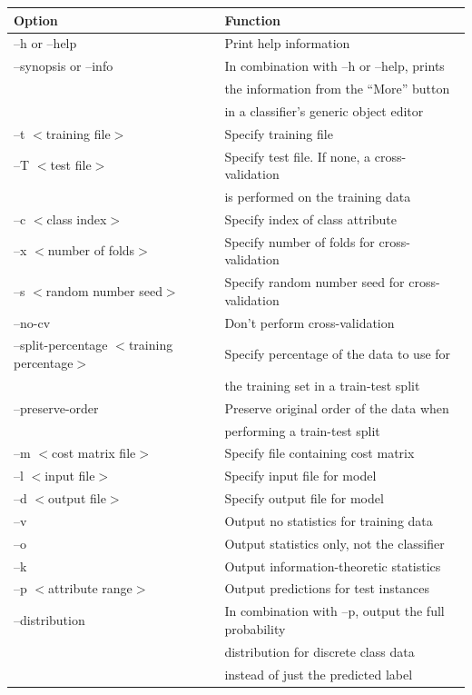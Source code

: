 \begin{table}[!thp]
\footnotesize
{\centering \begin{tabular}{ll}
\hline
Option & Function \\
\hline
--h or --help & Print help information \\
--synopsis or --info & In combination with --h or --help, prints \\
& the information from the ``More'' button \\
& in a classifier's generic object editor \\
--t $<$training file$>$ & Specify training file \\
--T $<$test file$>$ & Specify test file. If none, a cross-validation \\
& is performed on the training data \\
--c $<$class index$>$ & Specify index of class attribute \\
--x $<$number of folds$>$ & Specify number of folds for cross-validation \\
--s $<$random number seed$>$ & Specify random number seed for cross-validation \\
--no-cv & Don't perform cross-validation \\
--split-percentage $<$training percentage$>$ & Specify percentage of the data to use for \\
& the training set in a train-test split \\
--preserve-order & Preserve original order of the data when \\ 
& performing a train-test split \\
--m $<$cost matrix file$>$ & Specify file containing cost matrix \\
--l $<$input file$>$ & Specify input file for model \\
--d $<$output file$>$ & Specify output file for model \\
--v & Output no statistics for training data \\
--o & Output statistics only, not the classifier \\ 
--k & Output information-theoretic statistics \\
--p $<$attribute range$>$ & Output predictions for test instances \\
--distribution & In combination with --p, output the full probability \\ 
& distribution for discrete class data \\
& instead of just the predicted label \\

\end{tabular}}
\end{table}
